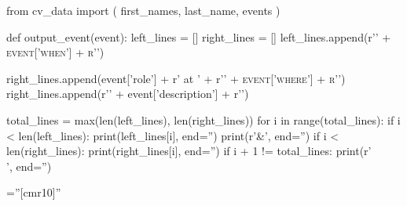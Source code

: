 \documentclass[10pt]{article} %
\begin{document}
\pagestyle{empty} %
\begin{pycode}
from cv_data import (
                        first_names,
                        last_name,
                        events
                    )

def output_event(event):
    left_lines = []
    right_lines = []
    left_lines.append(r'\textsc{' + event['when'] + r'}')

    right_lines.append(event['role'] + r' at ' + r'\textsc{' + event['where'] + r'}')
    right_lines.append(r'\footnotesize{' + event['description'] + r'}')

    total_lines = max(len(left_lines), len(right_lines))
    for i in range(total_lines):
        if i < len(left_lines):
            print(left_lines[i], end='')
        print(r'&', end='')
        if i < len(right_lines):
            print(right_lines[i], end='')
        if i + 1 != total_lines:
            print(r'\\', end='')

\end{pycode}

\font\fb=''[cmr10]'' %
\end{document}
